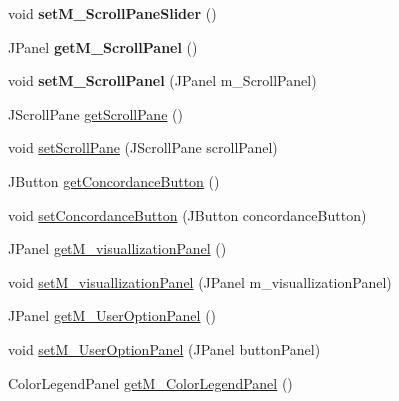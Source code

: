 \begin{DoxyCompactItemize}
void {\bfseries set\+M\+\_\+\+Scroll\+Pane\+Slider} ()
\item 
\mbox{\label{classtranslation_visualization_1_1_translation_visualization_a8b8444dad889ddc72169db2d37b66635}} 
J\+Panel {\bfseries get\+M\+\_\+\+Scroll\+Panel} ()
\item 
\mbox{\label{classtranslation_visualization_1_1_translation_visualization_a9604e2396e518903eb7804371d624725}} 
void {\bfseries set\+M\+\_\+\+Scroll\+Panel} (J\+Panel m\+\_\+\+Scroll\+Panel)
\item 
J\+Scroll\+Pane \hyperlink{classtranslation_visualization_1_1_translation_visualization_a48b65737bbc678d3d8bb5d18d16aa8b4}{get\+Scroll\+Pane} ()
\item 
void \hyperlink{classtranslation_visualization_1_1_translation_visualization_aa47fe2442c918ddf07a4d652aa452c2e}{set\+Scroll\+Pane} (J\+Scroll\+Pane scroll\+Panel)
\item 
J\+Button \hyperlink{classtranslation_visualization_1_1_translation_visualization_a32cb8b84921e6cb4e60546f487c4f178}{get\+Concordance\+Button} ()
\item 
void \hyperlink{classtranslation_visualization_1_1_translation_visualization_ae58f071059815461bf7fa76f08ffba1a}{set\+Concordance\+Button} (J\+Button concordance\+Button)
\item 
J\+Panel \hyperlink{classtranslation_visualization_1_1_translation_visualization_a2b39bd3900687d999084d68fc2594b97}{get\+M\+\_\+visuallization\+Panel} ()
\item 
void \hyperlink{classtranslation_visualization_1_1_translation_visualization_a044c4d17c8fb424e0ebd6cffa215f1d7}{set\+M\+\_\+visuallization\+Panel} (J\+Panel m\+\_\+visuallization\+Panel)
\item 
J\+Panel \hyperlink{classtranslation_visualization_1_1_translation_visualization_a5b90b2e6d17b9d84a57276e8a7b7f6c0}{get\+M\+\_\+\+User\+Option\+Panel} ()
\item 
void \hyperlink{classtranslation_visualization_1_1_translation_visualization_af88ee9e4607e9b967d5676718eec1e7d}{set\+M\+\_\+\+User\+Option\+Panel} (J\+Panel button\+Panel)
\item 
Color\+Legend\+Panel \hyperlink{classtranslation_visualization_1_1_translation_visualization_a6f2ac790f4247e0706fa9b51cf8e24d6}{get\+M\+\_\+\+Color\+Legend\+Panel} ()
\item 

\end{DoxyCompactItemize}
